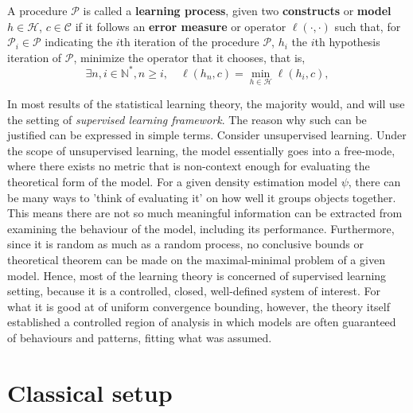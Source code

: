 \begin{definition}
  A procedure $\mathcal{P}$ is called a \textbf{learning process}, given two \textbf{constructs} or \textbf{model} $h\in \mathcal{H}$, $c\in \mathcal{C}$ if it follows an \textbf{error measure} or operator $\ell(\cdot, \cdot)$ such that, for $\mathcal{P}_{i}\in \mathcal{P}$ indicating the $i$th iteration of the procedure $\mathcal{P}$, $h_{i}$ the $i$th hypothesis iteration of $\mathcal{P}$, minimize the operator that it chooses, that is,
  \begin{equation}
    \exists n,i\in \mathbb{N}^{*}, n \geq i,  \quad  \ell(h_{n},c) = \min_{h\in \mathcal{H}}\ell(h_{i},c), 
  \end{equation} 
\end{definition}

In most results of the statistical learning theory, the majority would, and will use the setting of \textit{supervised learning framework}. The reason why such can be justified can be expressed in simple terms. Consider unsupervised learning. Under the scope of unsupervised learning, the model essentially goes into a free-mode, where there exists no metric that is non-context enough for evaluating the theoretical form of the model. For a given density estimation model $\psi$, there can be many ways to 'think of evaluating it' on how well it groups objects together. This means there are not so much meaningful information can be extracted from examining the behaviour of the model, including its performance. Furthermore, since it is random as much as a random process, no conclusive bounds or theoretical theorem can be made on the maximal-minimal problem of a given model. Hence, most of the learning theory is concerned of supervised learning setting, because it is a controlled, closed, well-defined system of interest. For what it is good at of uniform convergence bounding, however, the theory itself established a controlled region of analysis in which models are often guaranteed of behaviours and patterns, fitting what was assumed. 

\section{Classical setup}

